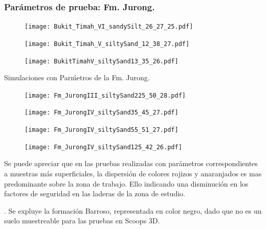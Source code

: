 \subsubsection{Par\'ametros de prueba: Fm. Jurong.}

\begin{figure}[H]
\centering
\begin{minipage}{.45\linewidth}
  \texttt{[image: Bukit\_Timah\_VI\_sandySilt\_26\_27\_25.pdf]}
  \label{fig:bukit1}
\end{minipage}
\hspace{.05\linewidth}
\begin{minipage}{.45\linewidth}
  \texttt{[image: Bukit\_Timah\_V\_siltySand\_12\_38\_27.pdf]}
  \label{fig:bukit2}
\end{minipage}
\begin{minipage}{.45\linewidth}
  \texttt{[image: BukitTimahV\_siltySand13\_35\_26.pdf]}
  \label{fig:bukit3}
\end{minipage}
\end{figure}




Simulaciones con Par\'metros de la Fm. Jurong.


\begin{figure}[H]
\centering
\begin{minipage}{.45\linewidth}
  \texttt{[image: Fm\_JurongIII\_siltySand225\_50\_28.pdf]}
  \label{fig:jurong1}
\end{minipage}
\hspace{.05\linewidth}
\begin{minipage}{.45\linewidth}
  \texttt{[image: Fm\_JurongIV\_siltySand35\_45\_27.pdf]}
  \label{fig:jurong2}
\end{minipage}
\begin{minipage}{.45\linewidth}
  \texttt{[image: Fm\_JurongIV\_siltySand55\_51\_27.pdf]}
  \label{fig:jurong3}
\end{minipage}
\begin{minipage}{.45\linewidth}
  \texttt{[image: Fm\_JurongIV\_siltySand125\_42\_26.pdf]}
  \label{fig:jurong4}
\end{minipage}
\end{figure}


Se puede apreciar que en las pruebas realizadas con par\'ametros correspondientes a muestras m\'as superficiales, la dispersi\'on de colores rojizos y anaranjados es mas predominante sobre la zona  de trabajo. Ello indicando una disminuci\'on en los factores de seguridad en las laderas de la zona de estudio.\par. Se expluye la formaci\'on Barroso, representada en color negro, dado que no es un suelo muestreable para las pruebas en Scoops 3D.

